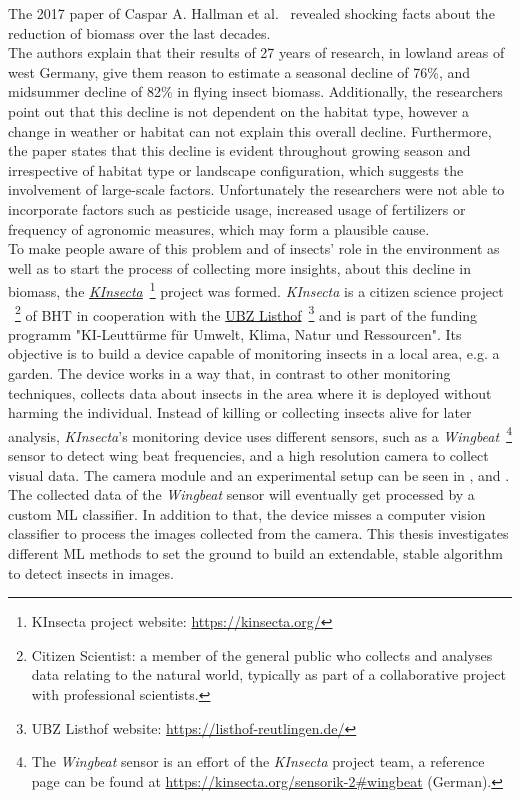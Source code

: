 The 2017 paper of Caspar A. Hallman et al.~\cite{biomassPaper} revealed shocking facts about the reduction of biomass over the last decades.\\
The authors explain that their results of 27 years of research, in lowland areas of west Germany, give them reason to estimate a seasonal decline of 76\%, and midsummer decline of 82\% in flying insect biomass.
Additionally, the researchers point out that this decline is not dependent on the habitat type, however a change in weather or habitat can not explain this overall decline.
Furthermore, the paper states that this decline is evident throughout growing season and irrespective of habitat type or landscape configuration, which suggests the involvement of large-scale factors.
Unfortunately the researchers were not able to incorporate factors such as pesticide usage, increased usage of fertilizers or frequency of agronomic measures, which may form a plausible cause.\\
To make people aware of this problem and of insects' role in the environment as well as to start the process of collecting more insights, about this decline in biomass, the \href{https://kinsecta.org}{\textit{KInsecta}}~\footnote{KInsecta project website: \url{https://kinsecta.org/}} project  was formed.
\textit{KInsecta} is a citizen science project
~\footnote{Citizen Scientist: a member of the general public who collects and analyses data relating to the natural world, typically as part of a collaborative project with professional scientists.}
of BHT in cooperation with the \href{http://listhof-reutlingen.de/}{UBZ Listhof}~\footnote{UBZ Listhof website: \url{https://listhof-reutlingen.de/}} and is part of the funding programm "KI-Leuttürme für Umwelt, Klima, Natur und Ressourcen".
Its objective is to build a device capable of monitoring insects in a local area, e.g. a garden.
The device works in a way that, in contrast to other monitoring techniques, collects data about insects in the area where it is deployed without harming the individual.
Instead of killing or collecting insects alive for later analysis, \textit{KInsecta}'s monitoring device uses different sensors, such as a
\textit{Wingbeat}~\footnote{
The \textit{Wingbeat} sensor is an effort of the \textit{KInsecta} project team, a reference page can be found at \url{https://kinsecta.org/sensorik-2\#wingbeat} (German).
}
sensor to detect wing beat frequencies, and a high resolution camera to collect visual data.
The camera module and an experimental setup can be seen in ,  and  .\\
The collected data of the \textit{Wingbeat} sensor will eventually get processed by a custom ML classifier.
In addition to that, the device misses a computer vision classifier to process the images collected from the camera.
This thesis investigates different ML methods to set the ground to build an extendable, stable algorithm to detect insects in images.

